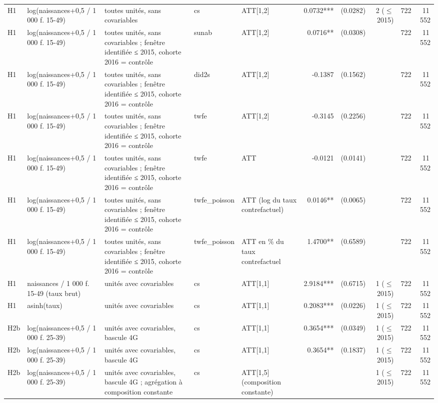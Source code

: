 \begin{table}
\begin{threeparttable}
\begin{tabular}{lp{4.0cm}p{6.1cm}lp{3.6cm}rrrrr}
H1 & log(naissances+0,5 / 1 000 f. 15-49) & toutes unités, sans covariables & cs & ATT[1,2] & 0.0732*** & (0.0282) & 2 ($\leq$ 2015) & 722 & 11\,552 \\
H1 & log(naissances+0,5 / 1 000 f. 15-49) & toutes unités, sans covariables ; fenêtre identifiée ≤ 2015, cohorte 2016 = contrôle & sunab & ATT[1,2] & 0.0716** & (0.0308) &  & 722 & 11\,552 \\
H1 & log(naissances+0,5 / 1 000 f. 15-49) & toutes unités, sans covariables ; fenêtre identifiée ≤ 2015, cohorte 2016 = contrôle & did2s & ATT[1,2] & -0.1387 & (0.1562) &  & 722 & 11\,552 \\
H1 & log(naissances+0,5 / 1 000 f. 15-49) & toutes unités, sans covariables ; fenêtre identifiée ≤ 2015, cohorte 2016 = contrôle & twfe & ATT[1,2] & -0.3145 & (0.2256) &  & 722 & 11\,552 \\
H1 & log(naissances+0,5 / 1 000 f. 15-49) & toutes unités, sans covariables ; fenêtre identifiée ≤ 2015, cohorte 2016 = contrôle & twfe & ATT & -0.0121 & (0.0141) &  & 722 & 11\,552 \\
H1 & log(naissances+0,5 / 1 000 f. 15-49) & toutes unités, sans covariables ; fenêtre identifiée ≤ 2015, cohorte 2016 = contrôle & twfe\_poisson & ATT (log du taux contrefactuel) & 0.0146** & (0.0065) &  & 722 & 11\,552 \\
H1 & log(naissances+0,5 / 1 000 f. 15-49) & toutes unités, sans covariables ; fenêtre identifiée ≤ 2015, cohorte 2016 = contrôle & twfe\_poisson & ATT en \% du taux contrefactuel & 1.4700** & (0.6589) &  & 722 & 11\,552 \\
H1 & naissances / 1 000 f. 15-49 (taux brut) & unités avec covariables & cs & ATT[1,1] & 2.9184*** & (0.6715) & 1 ($\leq$ 2015) & 722 & 11\,552 \\
H1 & asinh(taux) & unités avec covariables & cs & ATT[1,1] & 0.2083*** & (0.0226) & 1 ($\leq$ 2015) & 722 & 11\,552 \\
H2b & log(naissances+0,5 / 1 000 f. 25-39) & unités avec covariables, bascule 4G & cs & ATT[1,1] & 0.3654*** & (0.0349) & 1 ($\leq$ 2015) & 722 & 11\,552 \\
H2b & log(naissances+0,5 / 1 000 f. 25-39) & unités avec covariables, bascule 4G & cs & ATT[1,1] & 0.3654** & (0.1837) & 1 ($\leq$ 2015) & 722 & 11\,552 \\
H2b & log(naissances+0,5 / 1 000 f. 25-39) & unités avec covariables, bascule 4G ; agrégation à composition constante & cs & ATT[1,5] (composition constante) &  &  & 1 ($\leq$ 2015) & 722 & 11\,552 \\

\end{tabular}
\end{threeparttable}
\end{table}
